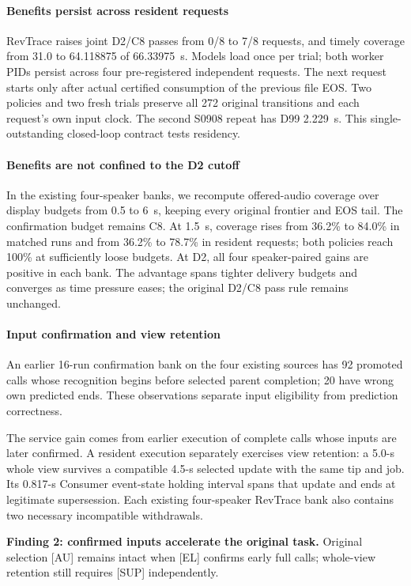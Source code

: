 \paragraph{Benefits persist across resident requests}
RevTrace raises joint D2/C8 passes from 0/8 to 7/8 requests, and timely
coverage from 31.0 to 64.118875 of 66.33975~s. Models load once per trial;
both worker PIDs persist across four pre-registered independent requests.
The next request starts only after actual certified consumption of the
previous file EOS. Two policies and two fresh trials preserve all 272
original transitions and each request's own input clock. The second
S0908 repeat has D99 2.229~s. This single-outstanding closed-loop contract
tests residency.

\paragraph{Benefits are not confined to the D2 cutoff}
In the existing four-speaker banks, we recompute offered-audio coverage over display budgets
from 0.5 to 6~s, keeping every original frontier and EOS tail.
The confirmation budget remains C8.
At 1.5~s, coverage rises from 36.2\% to 84.0\% in matched runs and
from 36.2\% to 78.7\% in resident requests; both policies reach 100\%
at sufficiently loose budgets. At D2, all four speaker-paired gains
are positive in each bank. The advantage spans tighter delivery budgets
and converges as time pressure eases; the original D2/C8 pass rule remains
unchanged.

\paragraph{Input confirmation and view retention}
An earlier 16-run confirmation bank on the four existing sources
has 92 promoted calls whose recognition
begins before selected parent completion; 20 have wrong own predicted
ends. These observations separate input eligibility from prediction correctness.

The service gain comes from earlier execution of complete
calls whose inputs are later confirmed. A resident execution separately
exercises view retention: a 5.0-s whole view survives a compatible 4.5-s
selected update with the same tip and job. Its 0.817-s Consumer event-state
holding interval spans that update and ends at legitimate supersession.
Each existing four-speaker RevTrace bank also contains two necessary
incompatible withdrawals.
\par\noindent\textbf{Finding 2: confirmed inputs accelerate the original task.}
Original selection [AU] remains intact when [EL] confirms early full calls;
whole-view retention still requires [SUP] independently.
